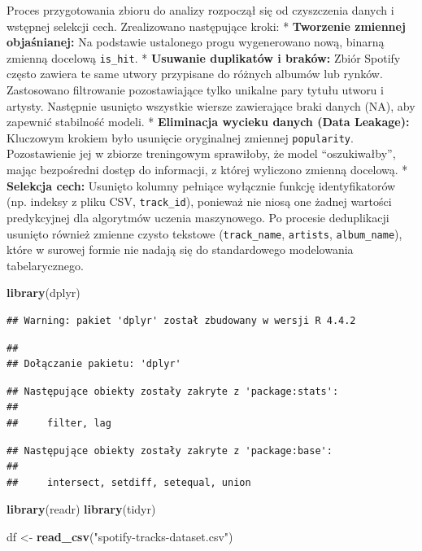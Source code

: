 \documentclass[
]{article}
\newenvironment{Shaded}{\begin{snugshade}}{\end{snugshade}}
\newcommand{\FunctionTok}[1]{\textcolor[rgb]{0.13,0.29,0.53}{\textbf{#1}}}
\newcommand{\NormalTok}[1]{#1}
\newcommand{\OtherTok}[1]{\textcolor[rgb]{0.56,0.35,0.01}{#1}}
\newcommand{\StringTok}[1]{\textcolor[rgb]{0.31,0.60,0.02}{#1}}
\begin{document}
Proces przygotowania zbioru do analizy rozpoczął się od czyszczenia
danych i wstępnej selekcji cech. Zrealizowano następujące kroki: *
\textbf{Tworzenie zmiennej objaśnianej:} Na podstawie ustalonego progu
wygenerowano nową, binarną zmienną docelową \texttt{is\_hit}. *
\textbf{Usuwanie duplikatów i braków:} Zbiór Spotify często zawiera te
same utwory przypisane do różnych albumów lub rynków. Zastosowano
filtrowanie pozostawiające tylko unikalne pary tytułu utworu i artysty.
Następnie usunięto wszystkie wiersze zawierające braki danych (NA), aby
zapewnić stabilność modeli. * \textbf{Eliminacja wycieku danych (Data
Leakage):} Kluczowym krokiem było usunięcie oryginalnej zmiennej
\texttt{popularity}. Pozostawienie jej w zbiorze treningowym sprawiłoby,
że model ``oszukiwałby'', mając bezpośredni dostęp do informacji, z
której wyliczono zmienną docelową. * \textbf{Selekcja cech:} Usunięto
kolumny pełniące wyłącznie funkcję identyfikatorów (np. indeksy z pliku
CSV, \texttt{track\_id}), ponieważ nie niosą one żadnej wartości
predykcyjnej dla algorytmów uczenia maszynowego. Po procesie
deduplikacji usunięto również zmienne czysto tekstowe
(\texttt{track\_name}, \texttt{artists}, \texttt{album\_name}), które w
surowej formie nie nadają się do standardowego modelowania
tabelarycznego.

\begin{Shaded}
\begin{Highlighting}[]
\FunctionTok{library}\NormalTok{(dplyr)}
\end{Highlighting}
\end{Shaded}

\begin{verbatim}
## Warning: pakiet 'dplyr' został zbudowany w wersji R 4.4.2
\end{verbatim}

\begin{verbatim}
## 
## Dołączanie pakietu: 'dplyr'
\end{verbatim}

\begin{verbatim}
## Następujące obiekty zostały zakryte z 'package:stats':
## 
##     filter, lag
\end{verbatim}

\begin{verbatim}
## Następujące obiekty zostały zakryte z 'package:base':
## 
##     intersect, setdiff, setequal, union
\end{verbatim}

\begin{Shaded}
\begin{Highlighting}[]
\FunctionTok{library}\NormalTok{(readr)}
\FunctionTok{library}\NormalTok{(tidyr)}

\NormalTok{df }\OtherTok{\textless{}{-}} \FunctionTok{read\_csv}\NormalTok{(}\StringTok{"spotify{-}tracks{-}dataset.csv"}\NormalTok{)}
\end{Highlighting}
\end{Shaded}
\end{document}
